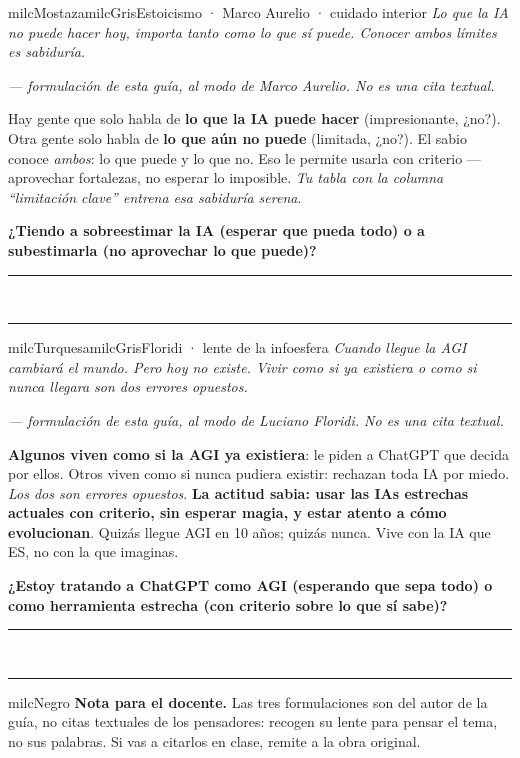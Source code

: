 \documentclass[11pt,letterpaper]{article}
\newcommand{\linead}[1]{\noindent\color{milcLinea}\rule{#1}{0.5pt}\color{milcNegro}}
\begin{document}
\begin{softbox}{milcMostaza}{milcGris}{Estoicismo · Marco Aurelio · cuidado interior}
\textit{Lo que la IA no puede hacer hoy, importa tanto como lo que sí puede. Conocer ambos límites es sabiduría.}

{\footnotesize\itshape\color{milcNegro!70}--- formulación de esta guía, al modo de Marco Aurelio. No es una cita textual.}

Hay gente que solo habla de \textbf{lo que la IA puede hacer} (impresionante, ¿no?). Otra gente solo habla de \textbf{lo que aún no puede} (limitada, ¿no?). El sabio conoce \emph{ambos}: lo que puede y lo que no. Eso le permite usarla con criterio --- aprovechar fortalezas, no esperar lo imposible. \emph{Tu tabla con la columna ``limitación clave'' entrena esa sabiduría serena}.

\textbf{¿Tiendo a sobreestimar la IA (esperar que pueda todo) o a subestimarla (no aprovechar lo que puede)?}
\end{softbox}
\linead{\linewidth}\\[1mm]
\linead{\linewidth}

\begin{softbox}{milcTurquesa}{milcGris}{Floridi · lente de la infoesfera}
\textit{Cuando llegue la AGI cambiará el mundo. Pero hoy no existe. Vivir como si ya existiera o como si nunca llegara son dos errores opuestos.}

{\footnotesize\itshape\color{milcNegro!70}--- formulación de esta guía, al modo de Luciano Floridi. No es una cita textual.}

\textbf{Algunos viven como si la AGI ya existiera}: le piden a ChatGPT que decida por ellos. Otros viven como si nunca pudiera existir: rechazan toda IA por miedo. \emph{Los dos son errores opuestos}. \textbf{La actitud sabia: usar las IAs estrechas actuales con criterio, sin esperar magia, y estar atento a cómo evolucionan}. Quizás llegue AGI en 10 años; quizás nunca. Vive con la IA que ES, no con la que imaginas.

\textbf{¿Estoy tratando a ChatGPT como AGI (esperando que sepa todo) o como herramienta estrecha (con criterio sobre lo que sí sabe)?}
\end{softbox}
\linead{\linewidth}\\[1mm]
\linead{\linewidth}

\begin{infoband}{milcNegro}
\textbf{Nota para el docente.} Las tres formulaciones son del autor de la guía, no citas textuales de los pensadores: recogen su lente para pensar el tema, no sus palabras. Si vas a citarlos en clase, remite a la obra original.
\end{infoband}
\end{document}
